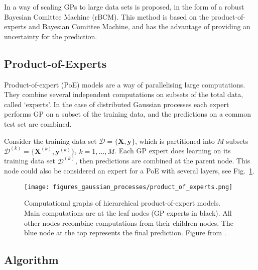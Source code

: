 \documentclass[twoside,english]{uiofysmaster}
\begin{document}
In \cite{deisenroth2015distributed} a way of scaling GPs to large data sets is proposed, in the form of a robust Bayesian Comittee Machine (rBCM). This method is based on the product-of-experts and Bayesian Comittee Machine, and has the advantage of providing an uncertainty for the prediction.


\subsection{Product-of-Experts}

Product-of-expert (PoE) models are a way of parallelising large computations. They combine several independent computations on subsets of the total data, called `experts'. In the case of distributed Gaussian processes each expert performs GP on a subset of the training data, and the predictions on a common test set are combined. 

Consider the training data set $\mathcal{D} = \{ \textbf{X}, \textbf{y}\}$, which is partitioned into $M$ subsets $\mathcal{D}^{(k)} = \{\textbf{X}^{(k)}, \textbf{y}^{(k)} \}$, $k = 1,...,M$. Each GP expert does learning on its training data set $\mathcal{D}^{(k)}$, then predictions are combined at the parent node. This node could also be considered an expert for a PoE with several layers, see Fig.~\ref{Fig:: gaussian process : DGP illustration of layers}. 

\begin{figure}
\texttt{[image: figures\_gaussian\_processes/product\_of\_experts.png]}
\caption{Computational graphs of hierarchical product-of-expert models. Main computations are at the leaf nodes (GP experts in black). All other nodes recombine computations from their children nodes. The blue node at the top represents the final prediction. Figure from \cite{deisenroth2015distributed}.}
\label{Fig:: gaussian process : DGP illustration of layers}
\end{figure}

\subsection{Algorithm}
\end{document}
